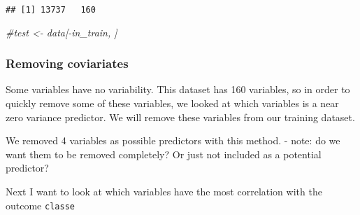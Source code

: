\documentclass[]{tufte-handout}
\newenvironment{Shaded}{}{}
\newcommand{\CommentTok}[1]{\textcolor[rgb]{0.38,0.63,0.69}{\textit{#1}}}
\newcommand{\DataTypeTok}[1]{\textcolor[rgb]{0.56,0.13,0.00}{#1}}
\newcommand{\KeywordTok}[1]{\textcolor[rgb]{0.00,0.44,0.13}{\textbf{#1}}}
\newcommand{\NormalTok}[1]{#1}
\newcommand{\OperatorTok}[1]{\textcolor[rgb]{0.40,0.40,0.40}{#1}}
\newcommand{\OtherTok}[1]{\textcolor[rgb]{0.00,0.44,0.13}{#1}}
\newcommand{\StringTok}[1]{\textcolor[rgb]{0.25,0.44,0.63}{#1}}
\begin{document}
\begin{verbatim}
## [1] 13737   160
\end{verbatim}

\begin{Shaded}
\begin{Highlighting}[]
\CommentTok{#test <- data[-in_train, ]}
\end{Highlighting}
\end{Shaded}

\hypertarget{removing-coviariates}{%
\subsubsection{Removing coviariates}\label{removing-coviariates}}

Some variables have no variability. This dataset has 160 variables, so
in order to quickly remove some of these variables, we looked at which
variables is a near zero variance predictor. We will remove these
variables from our training dataset.

\begin{Shaded}
\end{Shaded}

We removed 4 variables as possible predictors with this method. - note:
do we want them to be removed completely? Or just not included as a
potential predictor?

\begin{Shaded}
\end{Shaded}

Next I want to look at which variables have the most correlation with
the outcome \texttt{classe}
\end{document}
